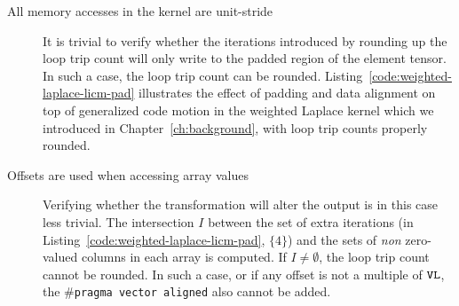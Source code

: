 \begin{description}
\item[All memory accesses in the kernel are unit-stride] It is trivial to verify whether the iterations introduced by rounding up the loop trip count will only write to the padded region of the element tensor. In such a case, the loop trip count can be rounded. Listing~\ref{code:weighted-laplace-licm-pad} illustrates the effect of padding and data alignment on top of generalized code motion in the weighted Laplace kernel which we introduced in Chapter~\ref{ch:background}, with loop trip counts properly rounded.

\item[Offsets are used when accessing array values] Verifying whether the transformation will alter the output is in this case less trivial. The intersection $I$ between the set of extra iterations (in Listing~\ref{code:weighted-laplace-licm-pad}, $\lbrace 4\rbrace$) and the sets of \textit{non} zero-valued columns in each array is computed. If $I \neq \emptyset$, the loop trip count cannot be rounded. In such a case, or if any offset is not a multiple of $\mbox{\texttt{VL}}$, the \texttt{$\#$pragma vector aligned} also cannot be added.
\end{description}

